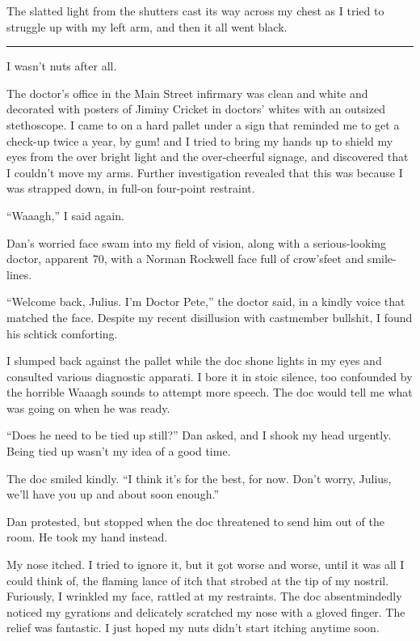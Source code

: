 The slatted light from the shutters cast its way across my chest as
I tried to struggle up with my left arm, and then it all went
black.

\begin{center}\rule{1in}{0.4pt}\end{center}

I wasn't nuts after all.

The doctor's office in the Main Street infirmary was clean and
white and decorated with posters of Jiminy Cricket in doctors'
whites with an outsized stethoscope. I came to on a hard pallet
under a sign that reminded me to get a check-up twice a year, by
gum! and I tried to bring my hands up to shield my eyes from the
over bright light and the over-cheerful signage, and discovered
that I couldn't move my arms. Further investigation revealed that
this was because I was strapped down, in full-on four-point
restraint.

“Waaagh,” I said again.

Dan's worried face swam into my field of vision, along with a
serious-looking doctor, apparent 70, with a Norman Rockwell face
full of crow'sfeet and smile-lines.

“Welcome back, Julius. I'm Doctor Pete,” the doctor said, in a
kindly voice that matched the face. Despite my recent disillusion
with castmember bullshit, I found his schtick comforting.

I slumped back against the pallet while the doc shone lights in my
eyes and consulted various diagnostic apparati. I bore it in stoic
silence, too confounded by the horrible Waaagh sounds to attempt
more speech. The doc would tell me what was going on when he was
ready.

“Does he need to be tied up still?” Dan asked, and I shook my head
urgently. Being tied up wasn't my idea of a good time.

The doc smiled kindly. “I think it's for the best, for now. Don't
worry, Julius, we'll have you up and about soon enough.”

Dan protested, but stopped when the doc threatened to send him out
of the room. He took my hand instead.

My nose itched. I tried to ignore it, but it got worse and worse,
until it was all I could think of, the flaming lance of itch that
strobed at the tip of my nostril. Furiously, I wrinkled my face,
rattled at my restraints. The doc absentmindedly noticed my
gyrations and delicately scratched my nose with a gloved finger.
The relief was fantastic. I just hoped my nuts didn't start itching
anytime soon.

